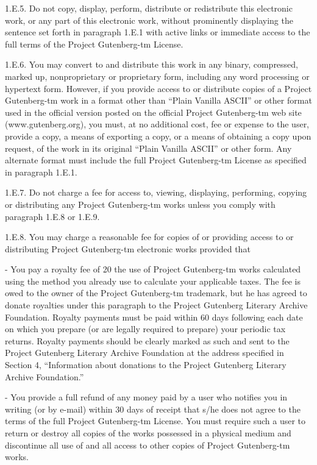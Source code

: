 1.E.5.  Do not copy, display, perform, distribute or redistribute this
electronic work, or any part of this electronic work, without
prominently displaying the sentence set forth in paragraph 1.E.1 with
active links or immediate access to the full terms of the Project
Gutenberg-tm License.

1.E.6.  You may convert to and distribute this work in any binary,
compressed, marked up, nonproprietary or proprietary form, including any
word processing or hypertext form.  However, if you provide access to or
distribute copies of a Project Gutenberg-tm work in a format other than
“Plain Vanilla ASCII” or other format used in the official version
posted on the official Project Gutenberg-tm web site (www.gutenberg.org),
you must, at no additional cost, fee or expense to the user, provide a
copy, a means of exporting a copy, or a means of obtaining a copy upon
request, of the work in its original “Plain Vanilla ASCII” or other
form.  Any alternate format must include the full Project Gutenberg-tm
License as specified in paragraph 1.E.1.

1.E.7.  Do not charge a fee for access to, viewing, displaying,
performing, copying or distributing any Project Gutenberg-tm works
unless you comply with paragraph 1.E.8 or 1.E.9.

1.E.8.  You may charge a reasonable fee for copies of or providing
access to or distributing Project Gutenberg-tm electronic works provided
that

- You pay a royalty fee of 20%
     the use of Project Gutenberg-tm works calculated using the method
     you already use to calculate your applicable taxes.  The fee is
     owed to the owner of the Project Gutenberg-tm trademark, but he
     has agreed to donate royalties under this paragraph to the
     Project Gutenberg Literary Archive Foundation.  Royalty payments
     must be paid within 60 days following each date on which you
     prepare (or are legally required to prepare) your periodic tax
     returns.  Royalty payments should be clearly marked as such and
     sent to the Project Gutenberg Literary Archive Foundation at the
     address specified in Section 4, “Information about donations to
     the Project Gutenberg Literary Archive Foundation.”

- You provide a full refund of any money paid by a user who notifies
     you in writing (or by e-mail) within 30 days of receipt that s/he
     does not agree to the terms of the full Project Gutenberg-tm
     License.  You must require such a user to return or
     destroy all copies of the works possessed in a physical medium
     and discontinue all use of and all access to other copies of
     Project Gutenberg-tm works.

